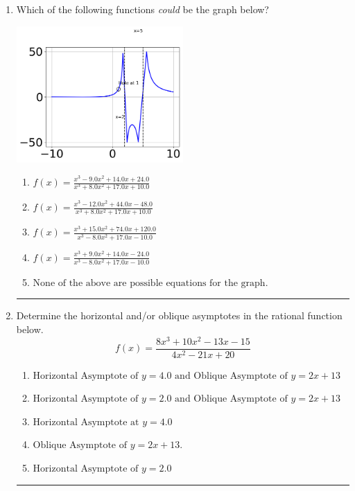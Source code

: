 \documentclass[14pt]{extbook}
\newcommand{\litem}[1]{\item#1\hspace*{-1cm}\rule{\textwidth}{0.4pt}}
\begin{document}
\begin{enumerate}
{\begin{enumerate}[label=\Alph*.]
\end{enumerate} }
\litem{
Which of the following functions \textit{could} be the graph below?
\begin{center}
    \includegraphics[width=0.5\textwidth]{../Figures/identifyGraphOfRationalFunctionB.png}
\end{center}
\begin{enumerate}[label=\Alph*.]
\item \( f(x)=\frac{x^{3} -9.0 x^{2} +14.0 x + 24.0}{x^{3} +8.0 x^{2} +17.0 x + 10.0} \)
\item \( f(x)=\frac{x^{3} -12.0 x^{2} +44.0 x -48.0}{x^{3} +8.0 x^{2} +17.0 x + 10.0} \)
\item \( f(x)=\frac{x^{3} +15.0 x^{2} +74.0 x + 120.0}{x^{3} -8.0 x^{2} +17.0 x -10.0} \)
\item \( f(x)=\frac{x^{3} +9.0 x^{2} +14.0 x -24.0}{x^{3} -8.0 x^{2} +17.0 x -10.0} \)
\item \( \text{None of the above are possible equations for the graph.} \)

\end{enumerate} }
\litem{
Determine the horizontal and/or oblique asymptotes in the rational function below.\[ f(x) = \frac{8x^{3} +10 x^{2} -13 x -15}{4x^{2} -21 x + 20} \]\begin{enumerate}[label=\Alph*.]
\item \( \text{Horizontal Asymptote of } y = 4.0 \text{ and Oblique Asymptote of } y = 2x + 13 \)
\item \( \text{Horizontal Asymptote of } y = 2.0 \text{ and Oblique Asymptote of } y = 2x + 13 \)
\item \( \text{Horizontal Asymptote at } y = 4.0 \)
\item \( \text{Oblique Asymptote of } y = 2x + 13. \)
\item \( \text{Horizontal Asymptote of } y = 2.0  \)


\end{enumerate}}
\end{enumerate}
\end{document}
